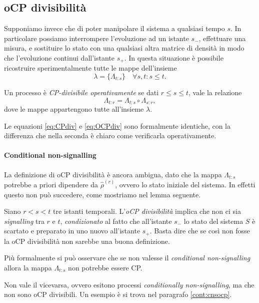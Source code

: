\documentclass[a4]{article}
\begin{document}
\subsection{oCP divisibilità}
Supponiamo invece che di poter manipolare il sistema a qualsiasi tempo \(s\). In
particolare possiamo interrompere l'evoluzione ad un istante \(s_-\), effettuare una
misura, e sostituire lo stato con una qualsiasi altra matrice di densità in modo che
l'evoluzione continui dall'istante \(s_+\). In questa situazione è  possibile  ricostruire
sperimentalmente tutte le mappe dell'insieme
\[\lambda = \{\Lambda_{t\colon s}\}  \quad \forall s,t\colon s \le t.\]  
\begin{defn}
Un processo è \emph{CP-divisibile operativamente} se dati \(r \le s \le  t\), vale la
relazione 
\begin{equation} \label{eq:OCPdiv}
\Lambda_{t\colon r} = \Lambda_{t\colon s} \circ \Lambda_{s\colon r},
\end{equation}
dove le mappe appartengono tutte all'insieme \(\lambda\).
\end{defn}
Le equazioni \eqref{eq:CPdiv} e \eqref{eq:OCPdiv} sono formalmente identiche, con la
differenza che nella seconda è chiaro come verificarla operativamente.

\paragraph{Conditional non-signalling}
La definizione di oCP divisibilità è ancora ambigua, dato che la mappa \(\Lambda_{t\colon s}\)
potrebbe a priori dipendere da \(\hat{\rho}^{(r)}\), ovvero lo stato iniziale del sistema.
In effetti questo non può succedere, come mostriamo nel lemma seguente.
\begin{lem}
	Siano \(r<s<t\) tre istanti temporali. L'\emph{oCP divisibilità} implica che non ci
	sia \emph{signalling} tra \(r\) e \(t\), \emph{condizionato} al fatto che all'istante
	\(s_-\) lo stato del sistema \(S\) è scartato e preparato in uno nuovo all'istante \(s_+\).
	\proof Basta dire che se così non fosse la oCP divisibilità non sarebbe una buona
	definizione. 
	
	Più formalmente si può osservare che se non valesse il \emph{conditional non-signalling}
	allora la mappa \(\Lambda_{t\colon s}\) non potrebbe essere CP. 
\end{lem}
\begin{ach}
	Non vale il vicevarsa, ovvero esitono processi \emph{conditionally non-signalling}, ma
	che non sono oCP divisibili. Un esempio è si trova nel paragrafo \ref{cont:cnsocp}.
\end{ach}
\end{document}
